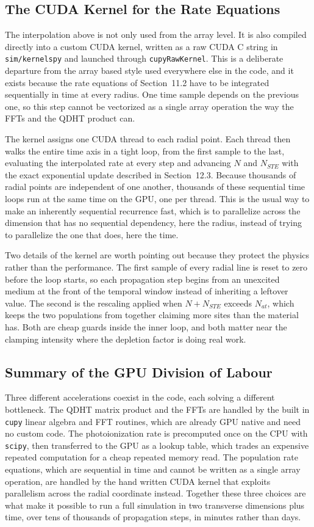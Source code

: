 \subsection{The CUDA Kernel for the Rate Equations}

The interpolation above is not only used from the array level. It is also compiled directly into a custom CUDA kernel, written as a raw CUDA C string in \texttt{sim/kernels\dotb py} and launched through \texttt{cupy\dotb RawKernel}. This is a deliberate departure from the array based style used everywhere else in the code, and it exists because the rate equations of Section~11.2 have to be integrated sequentially in time at every radius. One time sample depends on the previous one, so this step cannot be vectorized as a single array operation the way the FFTs and the QDHT product can.

The kernel assigns one CUDA thread to each radial point. Each thread then walks the entire time axis in a tight loop, from the first sample to the last, evaluating the interpolated rate at every step and advancing $N$ and $N_{STE}$ with the exact exponential update described in Section~12.3. Because thousands of radial points are independent of one another, thousands of these sequential time loops run at the same time on the GPU, one per thread. This is the usual way to make an inherently sequential recurrence fast, which is to parallelize across the dimension that has no sequential dependency, here the radius, instead of trying to parallelize the one that does, here the time.

Two details of the kernel are worth pointing out because they protect the physics rather than the performance. The first sample of every radial line is reset to zero before the loop starts, so each propagation step begins from an unexcited medium at the front of the temporal window instead of inheriting a leftover value. The second is the rescaling applied when $N+N_{STE}$ exceeds $N_{at}$, which keeps the two populations from together claiming more sites than the material has. Both are cheap guards inside the inner loop, and both matter near the clamping intensity where the depletion factor is doing real work.

\subsection{Summary of the GPU Division of Labour}

Three different accelerations coexist in the code, each solving a different bottleneck. The QDHT matrix product and the FFTs are handled by the built in \texttt{cupy} linear algebra and FFT routines, which are already GPU native and need no custom code. The photoionization rate is precomputed once on the CPU with \texttt{scipy}, then transferred to the GPU as a lookup table, which trades an expensive repeated computation for a cheap repeated memory read. The population rate equations, which are sequential in time and cannot be written as a single array operation, are handled by the hand written CUDA kernel that exploits parallelism across the radial coordinate instead. Together these three choices are what make it possible to run a full simulation in two transverse dimensions plus time, over tens of thousands of propagation steps, in minutes rather than days.
